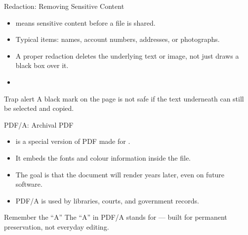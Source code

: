 \documentclass[aspectratio=169]{beamer}
\begin{document}
\begin{frame}{Redaction: Removing Sensitive Content}
  \begin{itemize}
    \item {} means  sensitive content
      before a file is shared.
    \item Typical items: names, account numbers, addresses, or photographs.
    \item A proper redaction deletes the underlying text or image, not just
      draws a black box over it.
    \item {}
  \end{itemize}
  \begin{alertblock}{Trap alert}
    A black mark on the page is not safe if the text underneath can still be
    selected and copied.
  \end{alertblock}
\end{frame}

\begin{frame}{PDF/A: Archival PDF}
  \begin{itemize}
    \item {} is a special  version of PDF made for
      .
    \item It embeds the fonts and colour information inside the file.
    \item The goal is that the document will render 
      years later, even on future software.
    \item PDF/A is used by libraries, courts, and government records.
  \end{itemize}
  \begin{block}{Remember the ``A''}
    The ``A'' in PDF/A stands for  --- built for permanent
    preservation, not everyday editing.
  \end{block}
\end{frame}
\end{document}

